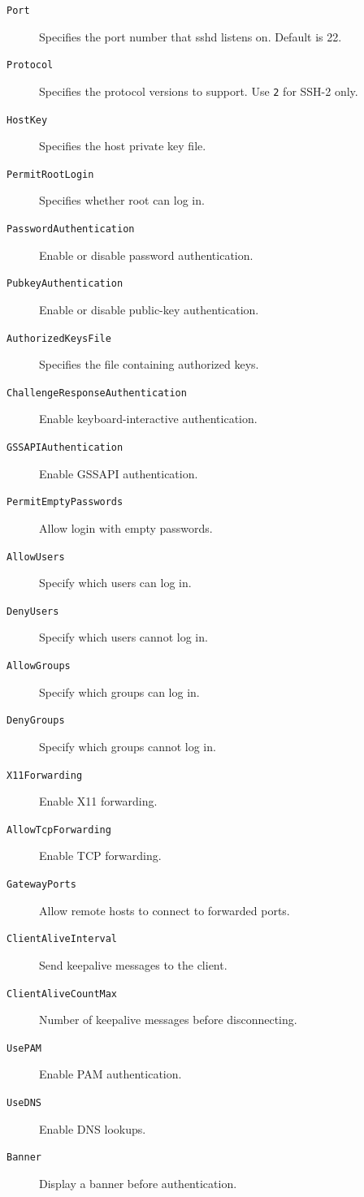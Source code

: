 \documentclass[12pt]{book}
\begin{document}
\begin{description}
    \item[\texttt{Port}] Specifies the port number that sshd listens on. Default is 22.
    \item[\texttt{Protocol}] Specifies the protocol versions to support. Use \texttt{2} for SSH-2 only.
    \item[\texttt{HostKey}] Specifies the host private key file.
    \item[\texttt{PermitRootLogin}] Specifies whether root can log in.
    \item[\texttt{PasswordAuthentication}] Enable or disable password authentication.
    \item[\texttt{PubkeyAuthentication}] Enable or disable public-key authentication.
    \item[\texttt{AuthorizedKeysFile}] Specifies the file containing authorized keys.
    \item[\texttt{ChallengeResponseAuthentication}] Enable keyboard-interactive authentication.
    \item[\texttt{GSSAPIAuthentication}] Enable GSSAPI authentication.
    \item[\texttt{PermitEmptyPasswords}] Allow login with empty passwords.
    \item[\texttt{AllowUsers}] Specify which users can log in.
    \item[\texttt{DenyUsers}] Specify which users cannot log in.
    \item[\texttt{AllowGroups}] Specify which groups can log in.
    \item[\texttt{DenyGroups}] Specify which groups cannot log in.
    \item[\texttt{X11Forwarding}] Enable X11 forwarding.
    \item[\texttt{AllowTcpForwarding}] Enable TCP forwarding.
    \item[\texttt{GatewayPorts}] Allow remote hosts to connect to forwarded ports.
    \item[\texttt{ClientAliveInterval}] Send keepalive messages to the client.
    \item[\texttt{ClientAliveCountMax}] Number of keepalive messages before disconnecting.
    \item[\texttt{UsePAM}] Enable PAM authentication.
    \item[\texttt{UseDNS}] Enable DNS lookups.
    \item[\texttt{Banner}] Display a banner before authentication.
\end{description}
\end{document}
